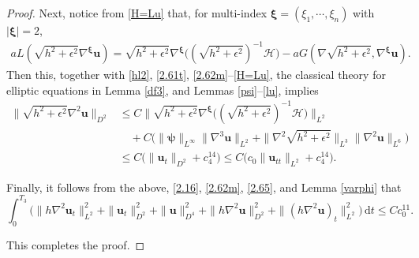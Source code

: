 \documentclass[11pt,reqno]{amsart}
\numberwithin{rk}{section}
\numberwithin{prop}{section}
\numberwithin{mydef}{section}
\numberwithin{lem}{section}
\numberwithin{equation}{section}
\numberwithin{thm}{section}
\begin{document}
\begin{proof}
Next, notice from \eqref{H=Lu} that, for multi-index $\boldsymbol{\xi}=(\xi_1,\cdots\!,\xi_n)$ with $|\boldsymbol{\xi}|=2$,  
\begin{equation*} 
\begin{aligned}
aL(\sqrt{h^2+\epsilon^2}\nabla^{\boldsymbol{\xi}} \boldsymbol{u})=\sqrt{h^2+\epsilon^2}\nabla^{\boldsymbol{\xi}}\big( (\sqrt{h^2+\epsilon^2})^{-1}\mathcal{H}\big)
-aG(\nabla\sqrt{h^2+\epsilon^2},\nabla^{\boldsymbol{\xi}}\boldsymbol{u}).
\end{aligned}
\end{equation*}
Then this, together with \eqref{hl2}, \eqref{2.61t}, \eqref{2.62m}--\eqref{H=Lu}, the classical theory for elliptic equations in Lemma \ref{df3}, and  Lemmas \ref{psi}--\ref{lu},  implies 
\begin{equation*} 
\begin{aligned}
\|\sqrt{h^2+\epsilon^2}\nabla^2\boldsymbol{u} \|_{D^2}
&\leq C\big\|\sqrt{h^2+\epsilon^2}\nabla^{\boldsymbol{\xi}}\big((\sqrt{h^2+\epsilon^2})^{-1}\mathcal{H}\big)\big\|_{L^2}\\
&\quad+C\big(\|\boldsymbol{\psi}\|_{L^\infty}\|\nabla^3\boldsymbol{u}\|_{L^2}+\|\nabla^2\sqrt{h^2+\epsilon^2}\|_{L^3}\|\nabla^2\boldsymbol{u}\|_{L^6}\big)\\
&\leq  C\big(\|\boldsymbol{u}_{t}\|_{D^2}+c_4^{14}\big) \leq  C\big(c_0\|\boldsymbol{u}_{tt}\|_{L^2}+c_4^{14}\big).
\end{aligned}
\end{equation*}

Finally, it follows from the above, \eqref{2.16}, \eqref{2.62m}, \eqref{2.65}, and Lemma \ref{varphi} that  
\begin{equation*} 
\int^{T_3}_0\big(\|h\nabla^2\boldsymbol{u}_t\|^2_{L^2}+\|\boldsymbol{u}_t\|^2_{D^2}+\|\boldsymbol{u}\|^2_{D^4}+\|h\nabla^2\boldsymbol{u}\|_{D^2}^2+\|(h\nabla^2\boldsymbol{u})_t\|^2_{L^2}\big)\,\mathrm{d}t\leq  Cc^{11}_0.
\end{equation*}

This completes the proof.
\end{proof}
\end{document}
